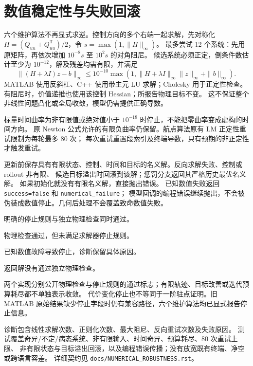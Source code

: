 \documentclass[UTF8,zihao=-4,openany,fontset=fandol]{ctexbook}
\newcommand{\code}[1]{\nolinkurl{#1}}
\begin{document}
\section{数值稳定性与失败回滚}

六个维护算法不再显式求逆。控制方向的多个右端一起求解，先对称化
$H=(Q_{uu}+Q_{uu}^{\mathsf T})/2$，令 $s=\max(1,\|H\|_\infty)$。
最多尝试 12 个系统：先用原矩阵，再依次增加 $10^{-8}s$ 至 $10^2s$ 的对角阻尼。
候选系统必须正定，倒条件数估计至少为 $10^{-12}$，解及残差均需有限，并满足
\[
 \|(H+\lambda I)z-b\|_\infty\le
 10^{-10}\max(1,\|H+\lambda I\|_\infty\|z\|_\infty+\|b\|_\infty).
\]
MATLAB 使用反斜杠、C++ 使用带主元 LU 求解；Cholesky 用于正定性检查。
有阻尼时，价值递推也使用该控制 Hessian；所报告物理目标不变。
这不保证整个非线性问题凸化或全局收敛，模型仍需提供正确导数。

标量时间曲率为非有限值或绝对值小于 $10^{-18}$ 时停止，不能把零曲率变成虚构的时间方向。
原 Newton 公式允许的有限负曲率仍保留。航点算法原有 LM 正定性重试限制为每轮最多 80 次；
每次重试重置段索引及终端导数，只有预期的非正定性才触发重试。

更新前保存具有有限状态、控制、时间和目标的名义解。反向求解失败、控制或 rollout 非有限、
候选目标溢出时回滚到该解；惩罚分支返回其严格历史最优名义解。
如果初始化就没有有限名义解，直接抛出错误。
已知数值失败返回 \code{success=false} 和 \code{numerical_failure}；
模型回调的编程错误继续抛出，不会被伪装成数值停止。几何后处理不会覆盖致命数值失败。

\begin{description}[leftmargin=1.5em]
 \item[\code{converged}] 明确的停止规则与独立物理检查同时通过。
 \item[\code{feasible_not_converged}] 物理检查通过，但未满足求解器停止规则。
 \item[\code{numerical_failure}] 已知数值故障导致停止，诊断保留具体原因。
 \item[\code{failed_checks}] 返回解没有通过独立物理检查。
\end{description}
两个实现分别公开物理检查与停止规则的通过标志；有限轨迹、目标改善或迭代预算耗尽都不单独表示收敛。
代价变化停止也不等同于一阶驻点证明。旧 MATLAB 原始结果缺少停止字段时仍有兼容路径，六个维护算法均已显式报告停止信息。

诊断包含线性求解次数、正则化次数、最大阻尼、反向重试次数及失败原因。
测试覆盖奇异/不定/病态系统、非有限输入、时间奇异、预算耗尽、80 次重试上限、
非有限状态与目标溢出回滚，以及编程错误传播；没有放宽既有终端、净空或跨语言容差。
详细契约见 \code{docs/NUMERICAL_ROBUSTNESS.rst}。
\end{document}
